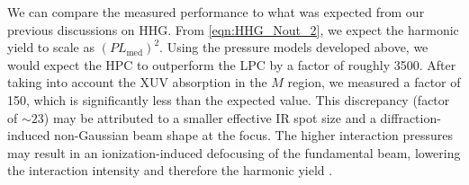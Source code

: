 We can compare the measured performance to what was expected from our previous discussions on HHG. From \cref{eqn:HHG_Nout_2}, we expect the harmonic yield to scale as $(PL_{\textrm{med}})^2$. Using the pressure models developed above, we would expect the HPC to outperform the LPC by a factor of roughly 3500. After taking into account the XUV absorption in the $M$ region, we measured a factor of 150, which is significantly less than the expected value. This discrepancy (factor of $\sim 23$) may be attributed to a smaller effective IR spot size and a diffraction-induced non-Gaussian beam shape at the focus. The higher interaction pressures may result in an ionization-induced defocusing of the fundamental beam, lowering the interaction intensity and therefore the harmonic yield \cite{altucciInfluenceAtomicDensity1996}.

%





